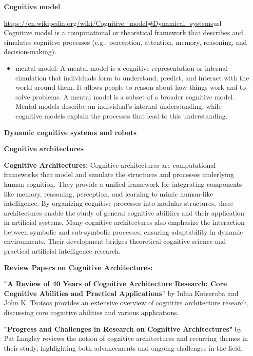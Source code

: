 \documentclass{book}
\providecommand{\ProjectDeepHeading}[2]{%
    \par\medskip\noindent\textbf{#2}\par\smallskip
}
\begin{document}
    \ProjectDeepHeading{1}{Cognitive model} \url{https://en.wikipedia.org/wiki/Cognitive_model\#Dynamical_systems}{url}
        Cognitive model is a computational or theoretical framework that describes and simulates cognitive processes (e.g., perception, attention, memory, reasoning, and decision-making).
        \begin{itemize}
            \item mental model: A mental model is a cognitive representation or internal simulation that individuals form to understand, predict, and interact with the world around them. It allows people to reason about how things work and to solve problems. A mental model is a subset of a broader cognitive model. Mental models describe an individual's internal understanding, while cognitive models explain the processes that lead to this understanding.
        \end{itemize}
    \ProjectDeepHeading{1}{Dynamic cognitive systems and robots}

    \ProjectDeepHeading{1}{Cognitive architectures}
        \textbf{Cognitive Architectures:} Cognitive architectures are computational frameworks that model and simulate the structures and processes underlying human cognition. They provide a unified framework for integrating components like memory, reasoning, perception, and learning to mimic human-like intelligence. By organizing cognitive processes into modular structures, these architectures enable the study of general cognitive abilities and their application in artificial systems. Many cognitive architectures also emphasize the interaction between symbolic and sub-symbolic processes, ensuring adaptability in dynamic environments. Their development bridges theoretical cognitive science and practical artificial intelligence research. 

        \ProjectDeepHeading{2}{Review Papers on Cognitive Architectures:}

            \textbf{"A Review of 40 Years of Cognitive Architecture Research: Core Cognitive Abilities and Practical Applications"} by Iuliia Kotseruba and John K. Tsotsos provides an extensive overview of cognitive architecture research, discussing core cognitive abilities and various applications. 

            \textbf{"Progress and Challenges in Research on Cognitive Architectures"} by Pat Langley reviews the notion of cognitive architectures and recurring themes in their study, highlighting both advancements and ongoing challenges in the field. 
\end{document}
